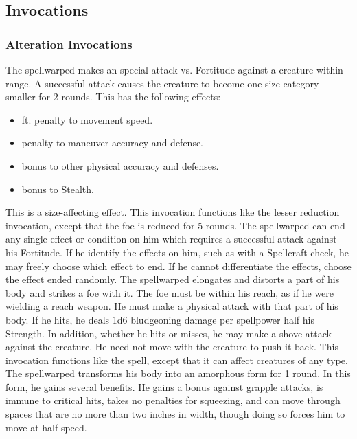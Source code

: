 \subsection{Invocations}\label{Invocations}

\subsubsection{Alteration Invocations}
The spellwarped makes an special attack vs. Fortitude against a creature within \rngclose range.
A successful attack causes the creature to become one size category smaller for 2 rounds.
This has the following effects:
\begin{itemize}
    \item {} ft. penalty to movement speed.
    \item {} penalty to maneuver accuracy and defense.
    \item {} bonus to other physical accuracy and defenses.
    \item {} bonus to Stealth.
\end{itemize}
This is a size-affecting effect.
This invocation functions like the lesser reduction invocation, except that the foe is reduced for 5 rounds.
The spellwarped can end any single effect or condition on him which requires a successful attack against his Fortitude.
If he identify the effects on him, such as with a Spellcraft check, he may freely choose which effect to end.
If he cannot differentiate the effects, choose the effect ended randomly.
The spellwarped elongates and distorts a part of his body and strikes a foe with it.
The foe must be within his reach, as if he were wielding a reach weapon.
He must make a physical attack with that part of his body.
If he hits, he deals 1d6 bludgeoning damage per spellpower \add half his Strength.
In addition, whether he hits or misses, he may make a shove attack against the creature.
He need not move with the creature to push it back.
 This invocation functions like the 
spell, except that it can affect creatures of any type.
The spellwarped transforms his body into an amorphous form for 1 round.
In this form, he gains several benefits.
He gains a  bonus against grapple attacks, is immune to critical hits, takes no penalties for squeezing, and can move through spaces that are no more than two inches in width, though doing so forces him to move at half speed.
